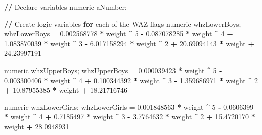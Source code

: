 \documentclass[12pt,a4paper]{article}
\newenvironment{Shaded}{\begin{snugshade}}{\end{snugshade}}
\newcommand{\DecValTok}[1]{\textcolor[rgb]{0.00,0.00,0.81}{#1}}
\newcommand{\FloatTok}[1]{\textcolor[rgb]{0.00,0.00,0.81}{#1}}
\newcommand{\StringTok}[1]{\textcolor[rgb]{0.31,0.60,0.02}{#1}}
\newcommand{\ControlFlowTok}[1]{\textcolor[rgb]{0.13,0.29,0.53}{\textbf{#1}}}
\newcommand{\OperatorTok}[1]{\textcolor[rgb]{0.81,0.36,0.00}{\textbf{#1}}}
\newcommand{\ErrorTok}[1]{\textcolor[rgb]{0.64,0.00,0.00}{\textbf{#1}}}
\newcommand{\NormalTok}[1]{#1}
\theoremstyle{definition}
\theoremstyle{definition}
\theoremstyle{definition}
\theoremstyle{remark}
\begin{document}
\begin{Shaded}
\begin{Highlighting}[]
\OperatorTok{/}\ErrorTok{/}\StringTok{ }\NormalTok{Declare variables}
\NormalTok{numeric aNumber;}

\OperatorTok{/}\ErrorTok{/}\StringTok{ }\NormalTok{Create logic variables }\ControlFlowTok{for}\NormalTok{ each of the WAZ flags}
\NormalTok{numeric whzLowerBoys;}
\NormalTok{whzLowerBoys =}\StringTok{ }\FloatTok{0.002568778} \OperatorTok{*}\StringTok{ }\NormalTok{weight }\OperatorTok{^}\StringTok{ }\DecValTok{5} \OperatorTok{-}\StringTok{ }\FloatTok{0.087078285} \OperatorTok{*}\StringTok{ }\NormalTok{weight }\OperatorTok{^}\StringTok{ }\DecValTok{4}
               \OperatorTok{+}\StringTok{ }\FloatTok{1.083870039} \OperatorTok{*}\StringTok{ }\NormalTok{weight }\OperatorTok{^}\StringTok{ }\DecValTok{3} \OperatorTok{-}\StringTok{ }\FloatTok{6.017158294} \OperatorTok{*}\StringTok{ }\NormalTok{weight }\OperatorTok{^}\StringTok{ }\DecValTok{2}
               \OperatorTok{+}\StringTok{ }\FloatTok{20.69094143} \OperatorTok{*}\StringTok{ }\NormalTok{weight }\OperatorTok{+}\StringTok{ }\FloatTok{24.23997191}

\NormalTok{numeric whzUpperBoys;}
\NormalTok{whzUpperBoys =}\StringTok{ }\FloatTok{0.000039423} \OperatorTok{*}\StringTok{ }\NormalTok{weight }\OperatorTok{^}\StringTok{ }\DecValTok{5} \OperatorTok{-}\StringTok{ }\FloatTok{0.003300406} \OperatorTok{*}\StringTok{ }\NormalTok{weight }\OperatorTok{^}\StringTok{ }\DecValTok{4}
               \OperatorTok{+}\StringTok{ }\FloatTok{0.100344392} \OperatorTok{*}\StringTok{ }\NormalTok{weight }\OperatorTok{^}\StringTok{ }\DecValTok{3} \OperatorTok{-}\StringTok{ }\FloatTok{1.359686971} \OperatorTok{*}\StringTok{ }\NormalTok{weight }\OperatorTok{^}\StringTok{ }\DecValTok{2}
               \OperatorTok{+}\StringTok{ }\FloatTok{10.87955385} \OperatorTok{*}\StringTok{ }\NormalTok{weight }\OperatorTok{+}\StringTok{ }\FloatTok{18.21716746}

\NormalTok{numeric whzLowerGirls;}
\NormalTok{whzLowerGirls =}\StringTok{ }\FloatTok{0.001848563} \OperatorTok{*}\StringTok{ }\NormalTok{weight }\OperatorTok{^}\StringTok{ }\DecValTok{5} \OperatorTok{-}\StringTok{ }\FloatTok{0.0606399} \OperatorTok{*}\StringTok{ }\NormalTok{weight }\OperatorTok{^}\StringTok{ }\DecValTok{4}
                \OperatorTok{+}\StringTok{ }\FloatTok{0.7185497} \OperatorTok{*}\StringTok{ }\NormalTok{weight }\OperatorTok{^}\StringTok{ }\DecValTok{3} \OperatorTok{-}\StringTok{ }\FloatTok{3.7764632} \OperatorTok{*}\StringTok{ }\NormalTok{weight }\OperatorTok{^}\StringTok{ }\DecValTok{2}
                \OperatorTok{+}\StringTok{ }\FloatTok{15.4720170} \OperatorTok{*}\StringTok{ }\NormalTok{weight }\OperatorTok{+}\StringTok{ }\FloatTok{28.0948931}


\end{Highlighting}
\end{Shaded}
\end{document}

